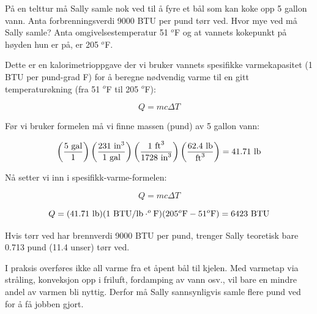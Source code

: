 
På en telttur må Sally samle nok ved til å fyre et bål som kan koke opp 5 gallon vann. Anta forbrenningsverdi 9000 BTU per pund tørr ved. Hvor mye ved må Sally samle? Anta omgivelsestemperatur 51 $^{o}$F og at vannets kokepunkt på høyden hun er på, er 205 $^{o}$F.







Dette er en kalorimetrioppgave der vi bruker vannets spesifikke varmekapasitet (1 BTU per pund-grad F) for å beregne nødvendig varme til en gitt temperaturøkning (fra 51 $^{o}$F til 205 $^{o}$F):

$$Q = mc \Delta T$$

Før vi bruker formelen må vi finne massen (pund) av 5 gallon vann:

$$\left(5 \hbox{ gal} \over 1 \right) \left( 231 \hbox{ in}^3 \over 1 \hbox{ gal} \right) \left(1 \hbox{ ft}^3 \over 1728 \hbox{ in}^3 \right) \left( 62.4 \hbox{ lb} \over \hbox{ft}^3 \right) = 41.71 \hbox{ lb}$$

Nå setter vi inn i spesifikk-varme-formelen:

$$Q = mc \Delta T$$

$$Q = (41.71 \hbox{ lb}) (1 \hbox{ BTU/lb}\cdot^o\hbox{F}) (205^o\hbox{F} - 51^o\hbox{F}) = 6423 \hbox{ BTU}$$

Hvis tørr ved har brennverdi 9000 BTU per pund, trenger Sally teoretisk bare 0.713 pund (11.4 unser) tørr ved.

\vskip 10pt

I praksis overføres ikke all varme fra et åpent bål til kjelen. Med varmetap via stråling, konveksjon opp i friluft, fordamping av vann osv., vil bare en mindre andel av varmen bli nyttig. Derfor må Sally sannsynligvis samle flere pund ved for å få jobben gjort.









